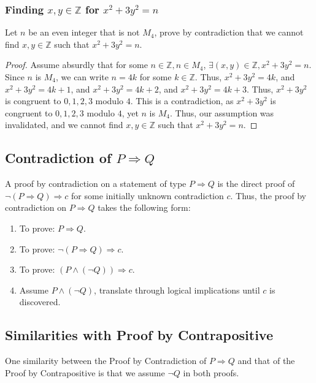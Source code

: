 \documentclass{article}
\begin{document}
\subsubsection*{Finding $x, y \in \mathbb{Z}$ for $x^2+3y^2=n$}

Let $n$ be an even integer that is not $M_4$, prove by contradiction that we cannot find $x, y \in \mathbb{Z}$ such that $x^2+3y^2=n$.

\begin{proof}
    Assume absurdly that for some $n \in \mathbb{Z}, n \in M_4$, $\exists (x, y) \in \mathbb{Z}, x^2+3y^2=n$. Since $n$ is $M_4$, we can write $n = 4k$ for some $k \in \mathbb{Z}$. Thus, $x^2+3y^2 = 4k$, and $x^2+3y^2 = 4k+1$, and $x^2+3y^2 = 4k+2$, and $x^2+3y^2 = 4k+3$. Thus, $x^2+3y^2$ is congruent to $0, 1, 2, 3$ modulo $4$. This is a contradiction, as $x^2+3y^2$ is congruent to $0, 1, 2, 3$ modulo $4$, yet $n$ is $M_4$. Thus, our assumption was invalidated, and we cannot find $x, y \in \mathbb{Z}$ such that $x^2+3y^2=n$.
\end{proof}

\subsection*{Contradiction of $P \Rightarrow Q$}

A proof by contradiction on a statement of type $P \Rightarrow Q$ is the direct proof of $\lnot (P \Rightarrow Q) \Rightarrow c$ for some initially unknown contradiction $c$. Thus, the proof by contradiction on $P \Rightarrow Q$ takes the following form:

\begin{enumerate}
    \item To prove: $P \Rightarrow Q$.
    \item To prove: $\lnot (P \Rightarrow Q) \Rightarrow c$.
    \item To prove: $(P \land (\lnot Q)) \Rightarrow c$.
    \item Assume $P \land (\lnot Q)$, translate through logical implications until $c$ is discovered.
\end{enumerate}

\subsection*{Similarities with Proof by Contrapositive}

One similarity between the Proof by Contradiction of $P \Rightarrow Q$ and that of the Proof by Contrapositive is that we assume $\lnot Q$ in both proofs.
\end{document}
